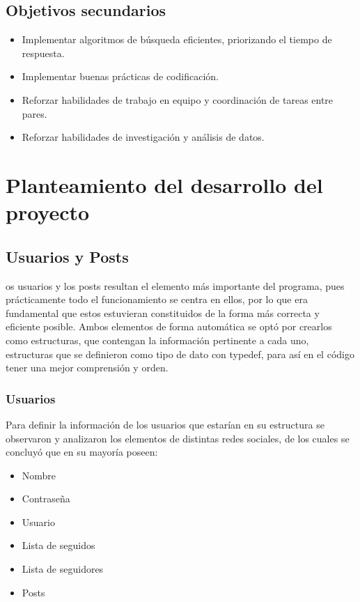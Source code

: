 \documentclass[9pt,letterpaper,onecolumn]{rho-class/rho}
\begin{document}
\subsection{Objetivos secundarios}
\begin{itemize}
	\item Implementar algoritmos de búsqueda eficientes, priorizando el tiempo de respuesta.
	\item Implementar buenas prácticas de codificación.
	\item Reforzar habilidades de trabajo en equipo y coordinación de tareas entre pares.
	\item Reforzar habilidades de investigación y análisis de datos.
\end{itemize}

\newpage
\section{Planteamiento del desarrollo del proyecto}


\subsection{Usuarios y Posts}

os usuarios y los posts resultan el elemento más importante del programa, pues prácticamente todo el funcionamiento se centra en ellos, por lo que era fundamental que estos estuvieran constituidos de la forma más correcta y eficiente posible. Ambos elementos de forma automática se optó por crearlos como estructuras, que contengan la información pertinente a cada uno, estructuras que se definieron como tipo de dato con typedef, para así en el código tener una mejor comprensión y orden.

\subsubsection{Usuarios}
Para definir la información de los usuarios que estarían en su estructura se observaron y analizaron los elementos de distintas redes sociales, de los cuales se concluyó que en su mayoría poseen:
\begin{itemize}
	\item Nombre
	\item Contraseña
	\item Usuario
	\item Lista de seguidos
	\item Lista de seguidores
	\item Posts
\end{itemize}
\end{document}

